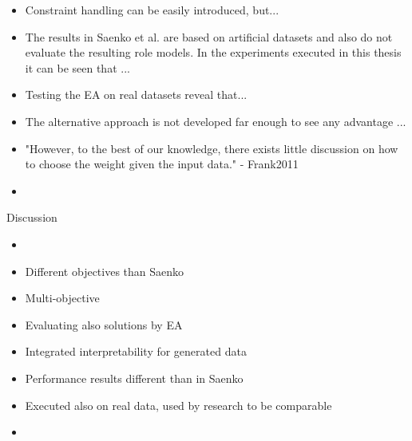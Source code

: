 \begin{itemize}
    \item Constraint handling can be easily introduced, but...
    \item The results in Saenko et al. are based on artificial datasets and also do not evaluate the resulting role models. In the experiments executed in this thesis it can be seen that ...
    \item Testing the EA on real datasets reveal that...
    \item The alternative approach is not developed far enough to see any advantage ...
    \item "However, to the best of our knowledge, there exists little discussion on how to choose the weight given the input data." - Frank2011
    \item 
\end{itemize}

\iffalse
\hl{State what you've done and what you've found
Summarize contributions (achievements and impact)
Outline open issues/directions for future work
\\\\
The final chapter of the Master's thesis is the Conclusions chapter. Here is where the writer sums up the entire project in one to two brief paragraphs. This chapter should remind the reader of the initial problem statement or hypothesis and then relate that to the results from the study. The writer should then present any conclusions reached or any new insights that arose from this work.  Finally, the writer should present the research in terms of the overall impact in the field. For example, how will the results of this study change the way a person or organization behaves or makes decisions? One caution when writing this chapter is not to merely reiterate the other portions of the thesis. Instead, the writer should strive to leave a lasting impression upon the reader, conveying with the same passion that drove the research project the importance of the work completed.
\\\\
Summary of the problem, the main findings and the discussion. Structured according to the issues in chapter 2.
Comparison with the literature presented in chapter 2: how do your results fill in, advance or contradict previously reported research?
What are the implications of your research for people working in the field that you have studies? In which direction should further research go? }
\fi

Discussion
\begin{itemize}
    \item 
    \item Different objectives than Saenko
    \item Multi-objective
    \item Evaluating also solutions by EA
    \item Integrated interpretability for generated data
    \item Performance results different than in Saenko
    \item Executed also on real data, used by research to be comparable
    \item
\end{itemize}